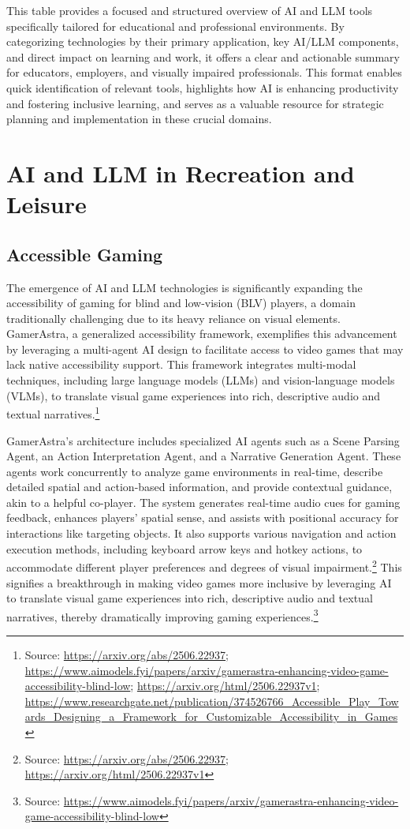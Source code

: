 This table provides a focused and structured overview of AI and LLM tools specifically tailored for educational and professional environments. By categorizing technologies by their primary application, key AI/LLM components, and direct impact on learning and work, it offers a clear and actionable summary for educators, employers, and visually impaired professionals. This format enables quick identification of relevant tools, highlights how AI is enhancing productivity and fostering inclusive learning, and serves as a valuable resource for strategic planning and implementation in these crucial domains.

\section{AI and LLM in Recreation and Leisure}

\subsection{Accessible Gaming}

The emergence of AI and LLM technologies is significantly expanding the accessibility of gaming for blind and low-vision (BLV) players, a domain traditionally challenging due to its heavy reliance on visual elements. GamerAstra, a generalized accessibility framework, exemplifies this advancement by leveraging a multi-agent AI design to facilitate access to video games that may lack native accessibility support. This framework integrates multi-modal techniques, including large language models (LLMs) and vision-language models (VLMs), to translate visual game experiences into rich, descriptive audio and textual narratives.\footnote{Source: \url{https://arxiv.org/abs/2506.22937}; \url{https://www.aimodels.fyi/papers/arxiv/gamerastra-enhancing-video-game-accessibility-blind-low}; \url{https://arxiv.org/html/2506.22937v1}; \url{https://www.researchgate.net/publication/374526766_Accessible_Play_Towards_Designing_a_Framework_for_Customizable_Accessibility_in_Games}}

GamerAstra’s architecture includes specialized AI agents such as a Scene Parsing Agent, an Action Interpretation Agent, and a Narrative Generation Agent. These agents work concurrently to analyze game environments in real-time, describe detailed spatial and action-based information, and provide contextual guidance, akin to a helpful co-player. The system generates real-time audio cues for gaming feedback, enhances players' spatial sense, and assists with positional accuracy for interactions like targeting objects. It also supports various navigation and action execution methods, including keyboard arrow keys and hotkey actions, to accommodate different player preferences and degrees of visual impairment.\footnote{Source: \url{https://arxiv.org/abs/2506.22937}; \url{https://arxiv.org/html/2506.22937v1}} This signifies a breakthrough in making video games more inclusive by leveraging AI to translate visual game experiences into rich, descriptive audio and textual narratives, thereby dramatically improving gaming experiences.\footnote{Source: \url{https://www.aimodels.fyi/papers/arxiv/gamerastra-enhancing-video-game-accessibility-blind-low}}

